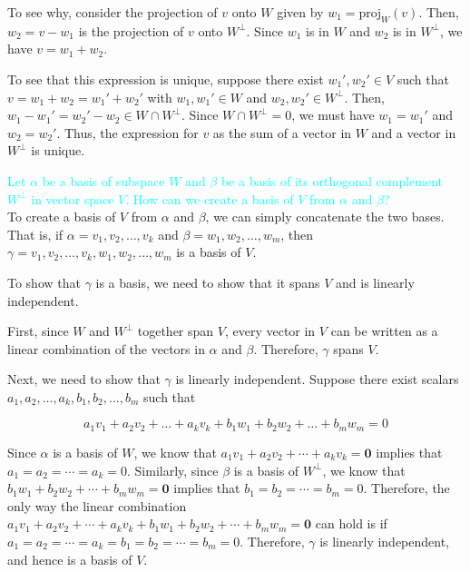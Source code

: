 \documentclass[fontsize=12pt]{scrartcl}
\begin{document}
\noindent
To see why, consider the projection of $v$ onto $W$ given by $w_1 = \text{proj}_W(v)$. Then, $w_2 = v - w_1$ is the projection of $v$ onto $W^{\perp}$. Since $w_1$ is in $W$ and $w_2$ is in $W^{\perp}$, we have $v = w_1 + w_2$.

\noindent
To see that this expression is unique, suppose there exist $w_1', w_2' \in V$ such that $v = w_1 + w_2 = w_1' + w_2'$ with $w_1, w_1' \in W$ and $w_2, w_2' \in W^{\perp}$. Then, $w_1 - w_1' = w_2' - w_2 \in W \cap W^{\perp}$. Since $W \cap W^{\perp} = {0}$, we must have $w_1 = w_1'$ and $w_2 = w_2'$. Thus, the expression for $v$ as the sum of a vector in $W$ and a vector in $W^{\perp}$ is unique.

\newpage

\noindent
\textcolor{cyan}{Let $\alpha$ be a basis of subspace $W$ and $\beta$ be a basis of its orthogonal complement $W^{\perp}$ in vector space $V$. How can we create a basis of $V$ from $\alpha$ and $\beta$?}\\

\noindent
To create a basis of $V$ from $\alpha$ and $\beta$, we can simply concatenate the two bases. That is, if $\alpha = {v_1, v_2, \ldots, v_k}$ and $\beta = {w_1, w_2, \ldots, w_m}$, then $\gamma = {v_1, v_2, \ldots, v_k, w_1, w_2, \ldots, w_m}$ is a basis of $V$.

\noindent
To show that $\gamma$ is a basis, we need to show that it spans $V$ and is linearly independent.

\noindent
First, since $W$ and $W^\perp$ together span $V$, every vector in $V$ can be written as a linear combination of the vectors in $\alpha$ and $\beta$. Therefore, $\gamma$ spans $V$.

\noindent
Next, we need to show that $\gamma$ is linearly independent. Suppose there exist scalars $a_1, a_2, \ldots, a_k, b_1, b_2, \ldots, b_m$ such that

$$a_1v_1 + a_2v_2+ \ldots + a_kv_k + b_1w_1 + b_2w_2 + \ldots + b_mw_m = 0 $$

\noindent
Since $\alpha$ is a basis of $W$, we know that $a_1v_1 + a_2v_2 + \cdots + a_kv_k = \mathbf{0}$ implies that $a_1 = a_2 = \cdots = a_k = 0$. Similarly, since $\beta$ is a basis of $W^\perp$, we know that $b_1w_1 + b_2w_2 + \cdots + b_mw_m = \mathbf{0}$ implies that $b_1 = b_2 = \cdots = b_m = 0$. Therefore, the only way the linear combination $a_1v_1 + a_2v_2 + \cdots + a_kv_k + b_1w_1 + b_2w_2 + \cdots + b_mw_m = \mathbf{0}$ can hold is if $a_1 = a_2 = \cdots = a_k = b_1 = b_2 = \cdots = b_m = 0$. Therefore, $\gamma$ is linearly independent, and hence is a basis of $V$.
\\
\end{document}
